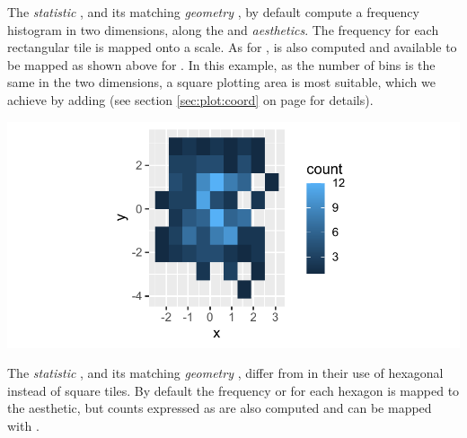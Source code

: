\documentclass[krantz2]{krantz}\usepackage{knitr}
\begin{document}
The \emph{statistic} , and its matching \emph{geometry} , by default compute a frequency histogram in two dimensions, along the  and  \emph{aesthetics}. The frequency for each rectangular tile is mapped onto a  scale. As for ,  is also computed and available to be mapped as shown above for . In this example, as the number of bins is the same in the two dimensions, a square plotting area is most suitable, which we achieve by adding  (see section \ref{sec:plot:coord} on page \pageref{sec:plot:coord} for details).

\begin{knitrout}\footnotesize
{}\color{fgcolor}\begin{kframe}
\begin{alltt}
  \hlopt{+}
  \hlstd{(} \hlstd{=} \hlstd{)} \hlopt{+}
  \hlstd{()}
\end{alltt}
\end{kframe}

{\centering \includegraphics[width=.7\textwidth]{figure/pos-bin2d-plot-01-1} 

}



\end{knitrout}

The \emph{statistic} , and its matching \emph{geometry} , differ from  in their use of hexagonal instead of square tiles. By default the frequency or  for each hexagon is mapped to the  aesthetic, but counts expressed as  are also computed and can be mapped with .
\end{document}

